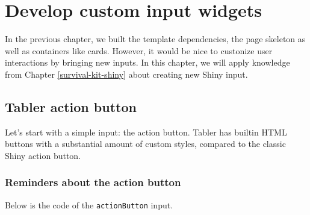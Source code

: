 \documentclass[]{book}
\newenvironment{Shaded}{\begin{snugshade}}{\end{snugshade}}
\newcommand{\ControlFlowTok}[1]{\textcolor[rgb]{0.13,0.29,0.53}{\textbf{#1}}}
\newcommand{\DataTypeTok}[1]{\textcolor[rgb]{0.13,0.29,0.53}{#1}}
\newcommand{\KeywordTok}[1]{\textcolor[rgb]{0.13,0.29,0.53}{\textbf{#1}}}
\newcommand{\NormalTok}[1]{#1}
\newcommand{\OperatorTok}[1]{\textcolor[rgb]{0.81,0.36,0.00}{\textbf{#1}}}
\newcommand{\OtherTok}[1]{\textcolor[rgb]{0.56,0.35,0.01}{#1}}
\newcommand{\StringTok}[1]{\textcolor[rgb]{0.31,0.60,0.02}{#1}}
\begin{document}
\hypertarget{custom-templates-inputs}{%
\chapter{Develop custom input widgets}\label{custom-templates-inputs}}

In the previous chapter, we built the template dependencies, the page skeleton as well as containers like cards. However, it would be nice to custonize user interactions by bringing new inputs. In this chapter, we will apply knowledge from Chapter \ref{survival-kit-shiny} about creating new Shiny input.

\hypertarget{tabler-action-button}{%
\section{Tabler action button}\label{tabler-action-button}}

Let's start with a simple input: the action button. Tabler has builtin HTML buttons with a substantial amount of custom styles, compared to the classic Shiny action button.

\hypertarget{reminders-about-the-action-button}{%
\subsection{Reminders about the action button}\label{reminders-about-the-action-button}}

Below is the code of the \texttt{actionButton} input.

\begin{Shaded}
\end{Shaded}
\end{document}
